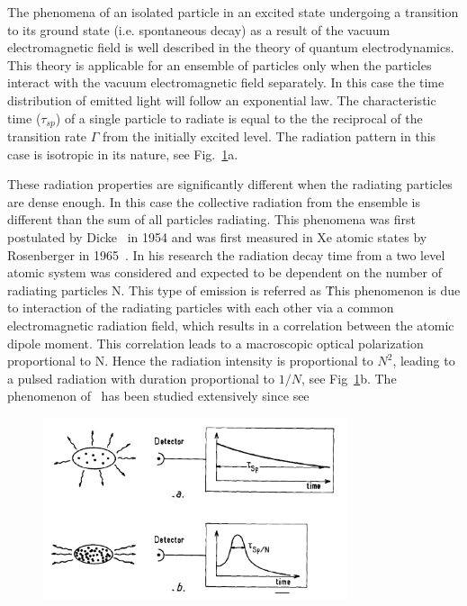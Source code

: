The phenomena of an isolated particle in an excited state undergoing a transition to its ground state (i.e. spontaneous decay) as a result of the vacuum electromagnetic field  is well described in the theory of quantum electrodynamics. This theory is applicable for an ensemble of particles only when the particles interact with the vacuum electromagnetic field separately. In this case the time distribution of emitted light will follow an exponential law. The characteristic time ($\tau_{sp}$) of a single particle to radiate is equal to the the reciprocal of the transition rate $\Gamma$ from the initially excited level. The radiation pattern in this case is isotropic in its nature, see Fig.~\ref{fig:emissionType}a. 

These radiation properties are significantly different when the radiating particles are dense enough. In this case the collective radiation from  the ensemble is different than the sum of all particles radiating. This phenomena was first postulated by Dicke~\cite{DickeSR} in 1954 and was first measured in Xe atomic states by Rosenberger in 1965~\cite{FirstMeasure}. In his research the radiation decay time from a two level atomic system was considered and expected to be dependent on the number of radiating particles N. This type of emission is referred as \superradiance\. This phenomenon is due to interaction of the radiating particles with each other via a common electromagnetic radiation field, which results in a correlation between the atomic dipole moment. This correlation leads to a macroscopic optical polarization proportional to N. Hence the radiation intensity is proportional to $N^2$, leading to a pulsed radiation with duration proportional to $1/N$, see Fig~\ref{fig:emissionType}b. The phenomenon of \superradiance\ has been studied extensively since see~\cite{Gross1982301,benedict1996super}  
\begin{figure}[t!]
	\centering
	\includegraphics[width=0.8\textwidth]{figs/emissionTypes.png}
	\label{fig:emissionType}
\end{figure}


